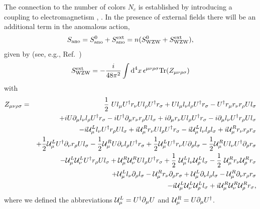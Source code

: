\documentclass[twoside,12pt]{article}
\begin{document}
   The connection to the number of colors $N_c$ is established by
introducing a coupling to electromagnetism \cite{Wess:1971yu}, \cite{Witten:1983tw}.
   In the presence of external fields there will be an additional
term in the anomalous action,
\begin{equation}
\label{4:8:sanofull}
S_{\rm ano}=
S_{\rm ano}^0+
S_{\rm ano}^{\rm ext}=n(S_{\rm WZW}^0+S_{\rm WZW}^{\rm ext}),
\end{equation}
given by (see, e.g., Ref.\ \cite{Bijnens:1993xi})
\begin{equation}
\label{3:3:2:deltaswzw}
S_{\rm WZW}^{\rm ext}= -\frac{i}{48\pi^2}\int \mbox{d}^4 x\,
\epsilon^{\mu\nu\rho\sigma}\mbox{Tr}(Z_{\mu\nu\rho\sigma})
\end{equation}
with
\begin{eqnarray}
\label{3:3:2:zmunialphabeta}
Z_{\mu\nu\rho\sigma}&=&
\frac{1}{2}\ U l_\mu U^\dagger r_\nu U l_\rho U^\dagger r_\sigma
+U l_\mu l_\nu l_\rho U^\dagger r_\sigma
 - U^\dagger r_\mu r_\nu r_\rho U l_\sigma\nonumber\\
&&+i  U\partial_\mu l_\nu l_\rho U^\dagger r_\sigma
 - i U^\dagger\partial_\mu r_\nu r_\rho U l_\sigma
 +i \partial_\mu r_\nu U l_\rho U^\dagger r_\sigma
 - i \partial_\mu l_\nu U^\dagger r_\rho U l_\sigma\nonumber\\
&&-i {\cal U}_\mu^L l_\nu U^\dagger r_\rho U l_\sigma
 + i {\cal U}_\mu^R r_\nu U l_\rho U^\dagger r_\sigma
 -i {\cal U}_\mu^L l_\nu l_\rho l_\sigma
 + i {\cal U}_\mu^R r_\nu r_\rho r_\sigma\nonumber\\
&&+\frac{1}{2}{\cal U}_\mu^L U^\dagger\partial_\nu r_\rho U l_\sigma
 -\frac{1}{2}{\cal U}_\mu^R U\partial_\nu l_\rho U^\dagger r_\sigma
 +\frac{1}{2}{\cal U}_\mu^L U^\dagger r_\nu U\partial_\rho l_\sigma
 -\frac{1}{2}{\cal U}_\mu^R U l_\nu U^\dagger\partial_\rho r_\sigma\nonumber\\
&&-{\cal U}_\mu^L{\cal U}_\nu^L U^\dagger r_\rho U l_\sigma
 + {\cal U}_\mu^R{\cal U}_\nu^R U l_\rho U^\dagger r_\sigma
+\frac{1}{2}\ {\cal U}_\mu^L l_\nu {\cal U}_\rho^L l_\sigma
 - \frac{1}{2}\ {\cal U}_\mu^R r_\nu {\cal U}_\rho^R r_\sigma\nonumber\\
&&+{\cal U}_\mu^L l_\nu\partial_\rho l_\sigma
 - {\cal U}_\mu^R r_\nu\partial_\rho r_\sigma+{\cal U}_\mu^L\partial_\nu  l_\rho l_\sigma
 - {\cal U}_\mu^R\partial_\nu  r_\rho r_\sigma\nonumber\\
&&-i {\cal U}_\mu^L{\cal U}_\nu^L{\cal U}_\rho^L l_\sigma
 + i {\cal U}_\mu^R{\cal U}_\nu^R{\cal U}_\rho^R r_\sigma,
\end{eqnarray}
where we defined the abbreviations ${\cal U}_\mu^L=U^\dagger\partial_\mu U$
and ${\cal U}_\mu^R=U\partial_\mu U^\dagger$.
\end{document}
